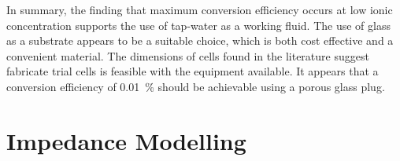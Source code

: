

    In summary, the finding that maximum conversion efficiency occurs at low ionic concentration supports the use of tap-water as a working fluid.
    The use of glass as a substrate appears to be a suitable choice, which is both cost effective and a convenient material.
    The dimensions of cells found in the literature suggest fabricate trial cells is feasible with the equipment available.
    It appears that a conversion efficiency of \SI{0.01}{\percent} should be achievable using a porous glass plug.



\section{Impedance Modelling}
  \label{sect:background_impedanceModelling}
